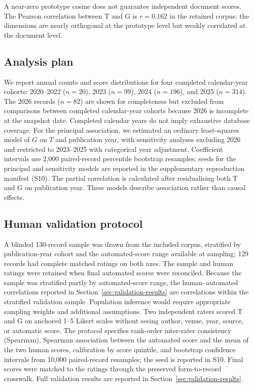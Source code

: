 \documentclass[a4paper,10pt,conference]{IEEEtran}
\begin{document}
A near-zero prototype cosine does not guarantee independent document scores.
The Pearson correlation between T and G is $r=0.162$ in the retained corpus:
the dimensions are nearly orthogonal at the prototype level but weakly
correlated at the document level.

\subsection{Analysis plan}

We report annual counts and score distributions for four
completed calendar-year cohorts: 2020--2022 ($n=20$), 2023
($n=99$), 2024 ($n=196$), and 2025
($n=314$). The 2026 records ($n=82$) are shown for completeness but excluded
from comparisons between completed calendar-year cohorts because 2026 is
incomplete at the snapshot date. Completed calendar years do not imply
exhaustive database coverage. For
the principal association, we estimated an ordinary least-squares model of $G$
on $T$ and publication year, with sensitivity analyses excluding 2026 and
restricted to 2023--2025 with categorical year adjustment. Coefficient intervals
use 2,000 paired-record percentile bootstrap resamples; seeds for the principal
and sensitivity models are reported in the supplementary reproduction manifest
(S10). The partial correlation is calculated after residualising both T and G
on publication year.
These models describe association rather than causal effects.

\subsection{Human validation protocol}

A blinded 130-record sample was drawn from the included corpus, stratified by
publication-year cohort and the automated-score range available at sampling;
129 records had complete matched ratings on both axes. The sample and human
ratings were retained when final automated scores were reconciled. Because the sample was
stratified partly by automated-score range, the human--automated correlations
reported in Section~\ref{sec:validation-results} are correlations within the
stratified validation sample. Population inference would require appropriate
sampling weights and additional assumptions. Two independent raters scored T and G on anchored
1--5 Likert scales without seeing author,
venue, year, source, or automatic score. The
protocol specifies rank-order inter-rater consistency (Spearman), Spearman
association between the automated score and the mean of the two human scores,
calibration by score quintile, and bootstrap confidence intervals from 10,000
paired-record resamples; the seed is reported in S10. Final scores were matched to
the ratings through the preserved form-to-record crosswalk. Full validation results are reported in
Section~\ref{sec:validation-results}.
\end{document}
